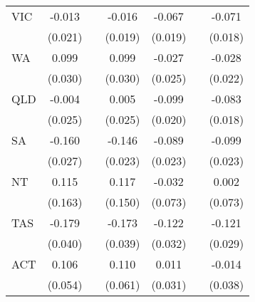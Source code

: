 {\begin{tabular}{l*{6}{c}}
VIC                 &      -0.013         &                     &      -0.016         &      -0.067\sym{***}&                     &      -0.071\sym{***}\\
                    &     (0.021)         &                     &     (0.019)         &     (0.019)         &                     &     (0.018)         \\
WA                  &       0.099\sym{***}&                     &       0.099\sym{***}&      -0.027         &                     &      -0.028         \\
                    &     (0.030)         &                     &     (0.030)         &     (0.025)         &                     &     (0.022)         \\
QLD                 &      -0.004         &                     &       0.005         &      -0.099\sym{***}&                     &      -0.083\sym{***}\\
                    &     (0.025)         &                     &     (0.025)         &     (0.020)         &                     &     (0.018)         \\
SA                  &      -0.160\sym{***}&                     &      -0.146\sym{***}&      -0.089\sym{***}&                     &      -0.099\sym{***}\\
                    &     (0.027)         &                     &     (0.023)         &     (0.023)         &                     &     (0.023)         \\
NT                  &       0.115         &                     &       0.117         &      -0.032         &                     &       0.002         \\
                    &     (0.163)         &                     &     (0.150)         &     (0.073)         &                     &     (0.073)         \\
TAS                 &      -0.179\sym{***}&                     &      -0.173\sym{***}&      -0.122\sym{***}&                     &      -0.121\sym{***}\\
                    &     (0.040)         &                     &     (0.039)         &     (0.032)         &                     &     (0.029)         \\
ACT                 &       0.106\sym{*}  &                     &       0.110\sym{*}  &       0.011         &                     &      -0.014         \\
                    &     (0.054)         &                     &     (0.061)         &     (0.031)         &                     &     (0.038)         \\

\end{tabular}}
